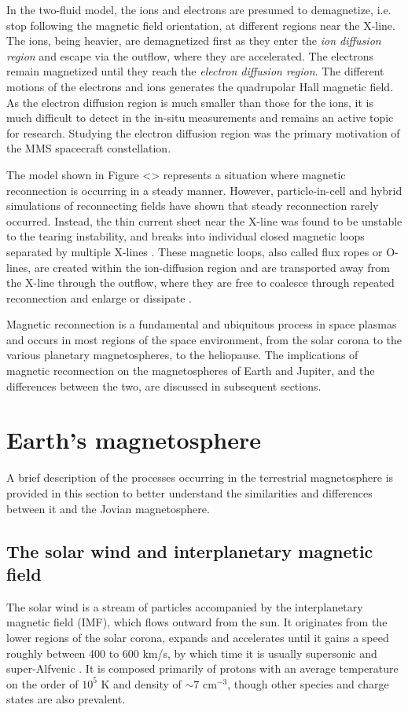 In the two-fluid model, the ions and electrons are presumed to demagnetize, i.e. stop following the magnetic field orientation, at different regions near the X-line. The ions, being heavier, are demagnetized first as they enter the \emph{ion diffusion region} and escape via the outflow, where they are accelerated. The electrons remain magnetized until they reach the \emph{electron diffusion region}. The different motions of the electrons and ions generates the quadrupolar Hall magnetic field. As the electron diffusion region is much smaller than those for the ions, it is much difficult to detect in the in-situ measurements and remains an active topic for research. Studying the electron diffusion region was the primary motivation of the MMS spacecraft constellation. 

The model shown in Figure <> represents a situation where magnetic reconnection is occurring in a steady manner. However, particle-in-cell and hybrid simulations of reconnecting fields have shown that steady reconnection rarely occurred. Instead, the thin current sheet near the X-line was found to be unstable to the tearing instability, and breaks into individual closed magnetic loops separated by multiple X-lines \cite{Drake2006ElectronReconnection,Drake2006FormationReconnection}. These magnetic loops, also called flux ropes or O-lines, are created within the ion-diffusion region and are transported away from the X-line through the outflow, where they are free to coalesce through repeated reconnection and enlarge or dissipate \cite{Markidis2012CollisionlessChain,Wang2016CoalescenceReconnection}. 

Magnetic reconnection is a fundamental and ubiquitous process in space plasmas and occurs in most regions of the space environment, from the solar corona to the various planetary magnetospheres, to the heliopause. The implications of magnetic reconnection on the magnetospheres of Earth and Jupiter, and the differences between the two, are discussed in subsequent sections.


\section{Earth's magnetosphere}
A brief description of the processes occurring in the terrestrial magnetosphere is provided in this section to better understand the similarities and differences between it and the Jovian magnetosphere.

\subsection{The solar wind and interplanetary magnetic field}
The solar wind is a stream of particles accompanied by the interplanetary magnetic field (IMF), which flows outward from the sun. It originates from the lower regions of the solar corona, expands and accelerates until it gains a speed roughly between 400 to 600 km/s, by which time it is usually supersonic and super-Alfvenic \cite{Gombosi1998PhysicsEnvironment}. It is composed primarily of protons with an average temperature on the order of $10^5$ K and density of $\sim$7 cm$^{-3}$, though other species and charge states are also prevalent.

